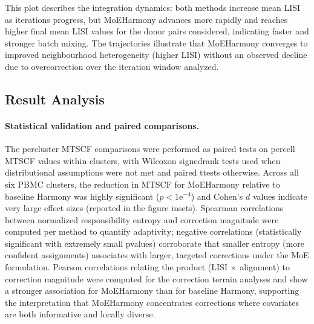 \documentclass{article}
\begin{document}
This plot describes the integration dynamics: both methods increase mean LISI as iterations progress, but MoE\-Harmony advances more rapidly and reaches higher final mean LISI values for the donor pairs considered, indicating faster and stronger batch mixing. The trajectories illustrate that MoE\-Harmony converges to improved neighbourhood heterogeneity (higher LISI) without an observed decline due to overcorrection over the iteration window analyzed.

\subsection*{Result Analysis}

\paragraph{Statistical validation and paired comparisons.} The per\-cluster MTSCF comparisons were performed as paired tests on per\-cell MTSCF values within clusters, with Wilcoxon signed\-rank tests used when distributional assumptions were not met and paired t\-tests otherwise. Across all six PBMC clusters, the reduction in MTSCF for MoE\-Harmony relative to baseline Harmony was highly significant ($p < 1\mathrm{e}^{-4}$) and Cohen’s $d$ values indicate very large effect sizes (reported in the figure insets). Spearman correlations between normalized responsibility entropy and correction magnitude were computed per method to quantify adaptivity; negative correlations (statistically significant with extremely small p\-values) corroborate that smaller entropy (more confident assignments) associates with larger, targeted corrections under the MoE formulation. Pearson correlations relating the product (LISI $\times$ alignment) to correction magnitude were computed for the correction terrain analyses and show a stronger association for MoE\-Harmony than for baseline Harmony, supporting the interpretation that MoE\-Harmony concentrates corrections where covariates are both informative and locally diverse.
\end{document}
